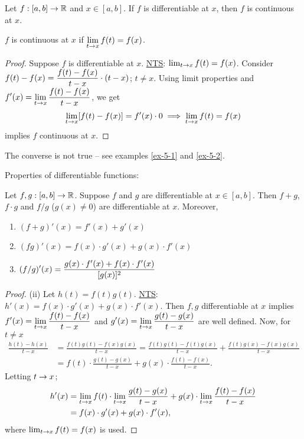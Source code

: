 \documentclass[]{article}
\begin{document}
\begin{theorem}
	Let $f:[a,b]\rightarrow\mathbb{R}$ and $x\in[a,b]$.
	If $f$ is differentiable at $x$, then $f$ is continuous at $x$.
\end{theorem}
\begin{recall}
	$f$ is continuous at $x$ if $\displaystyle\lim_{t\rightarrow x}f(t)=f(x)$.
\end{recall}
\begin{proof}
	Suppose $f$ is differentiable at $x$.
	\ul{\ul{NTS}}: $\lim_{t\rightarrow x}f(t)=f(x)$.
	Consider $\displaystyle f(t)-f(x) = \frac{f(t)-f(x)}{t-x}\cdot(t-x)$; $t\neq x$.
	Using limit properties and $\displaystyle f'(x)=\lim_{t\rightarrow x}\frac{f(t)-f(x)}{t-x}$, we get 
	$$\lim_{t\rightarrow x} [f(t)-f(x)] = f'(x)\cdot0 \implies \lim_{t\rightarrow x} f(t) = f(x) $$ 
	implies $f$ continuous at $x$.
\end{proof}
\begin{remark}
	The converse is not true -- see examples \ref{ex-5-1} and \ref{ex-5-2}.
\end{remark}
Properties of differentiable functions:
\begin{theorem}
	Let $f,g:[a,b]\rightarrow\mathbb{R}$.
	Suppose $f$ and $g$ are differentiable at $x\in[a,b]$.
	Then $f+g$, $f\cdot g$ and $f/g$ ($g(x)\neq0$) are differentiable at $x$.
	Moreover,
	\begin{enumerate}
		\item[(i)] $(f+g)'(x) = f'(x)+g'(x)$
		\item[(ii)] $(fg)'(x) = f(x)\cdot g'(x)+g(x)\cdot f'(x)$
		\item[(iii)] $\displaystyle(f/g)'(x) = \frac{g(x)\cdot f'(x)+f(x)\cdot f'(x)}{[g(x)]^2}$
	\end{enumerate}
\end{theorem}
\begin{proof}
	(ii) Let $h(t) = f(t)g(t)$.
	\ul{NTS}: $h'(x) = f(x)\cdot g'(x)+g(x)\cdot f'(x)$.
	Then $f,g$ differentiable at $x$ implies $\displaystyle f'(x) = \lim_{t\rightarrow x} \frac{f(t)-f(x)}{t-x}$ and $\displaystyle g'(x) = \lim_{t\rightarrow x} \frac{g(t)-g(x)}{t-x}$ are well defined.
	Now, for $t\neq x$
	\begin{align*}
		\frac{h(t)-h(x)}{t-x} &= \frac{f(t)g(t)-f(x)g(x)}{t-x} = \frac{f(t)g(t) - f(t)g(x)}{t-x} + \frac{f(t)g(x) - f(x)g(x)}{t-x} \\
							  &= f(t)\cdot\frac{g(t)-g(x)}{t-x} + g(x)\cdot\frac{f(t)-f(x)}{t-x}.
	\end{align*}
	Letting $t\rightarrow x$;
	\begin{align*}
		h'(x) &= \lim_{t\rightarrow x} f(t)\cdot \lim_{t\rightarrow x}\frac{g(t)-g(x)}{t-x} + g(x)\cdot \lim_{t\rightarrow x}\frac{f(t)-f(x)}{t-x} \\
			  &= f(x)\cdot g'(x)+g(x)\cdot f'(x),
	\end{align*}
	where $\lim_{t\rightarrow x} f(t) = f(x)$ is used.
\end{proof}
\end{document}
